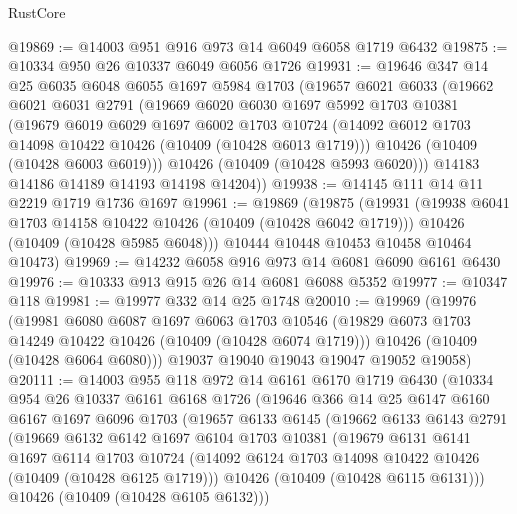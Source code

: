 \begin{lexlean}{RustCore}
\begin{coremodule}
@19869 := @14003 @951 @916 @973 @14 @6049 @6058 @1719 @6432
@19875 := @10334 @950 @26 @10337 @6049 @6056 @1726
@19931 := @19646
    @347
    @14
    @25
    @6035
    @6048
    @6055
    @1697
    @5984
    @1703
    (@19657
      @6021
      @6033
      (@19662
        @6021
        @6031
        @2791
        (@19669
          @6020
          @6030
          @1697
          @5992
          @1703
          @10381
          (@19679
            @6019
            @6029
            @1697
            @6002
            @1703
            @10724
            (@14092 @6012 @1703 @14098 @10422 @10426 (@10409 (@10428 @6013 @1719)))
            @10426
            (@10409 (@10428 @6003 @6019)))
          @10426
          (@10409 (@10428 @5993 @6020)))
        @14183
        @14186
        @14189
        @14193
        @14198
        @14204))
@19938 := @14145 @111 @14 @11 @2219 @1719 @1736 @1697
@19961 := @19869
    (@19875
      (@19931
        (@19938 @6041 @1703 @14158 @10422 @10426 (@10409 (@10428 @6042 @1719)))
        @10426
        (@10409 (@10428 @5985 @6048)))
      @10444
      @10448
      @10453
      @10458
      @10464
      @10473)
@19969 := @14232 @6058 @916 @973 @14 @6081 @6090 @6161 @6430
@19976 := @10333 @913 @915 @26 @14 @6081 @6088 @5352
@19977 := @10347 @118
@19981 := @19977 @332 @14 @25 @1748
@20010 := @19969
    (@19976
      (@19981
        @6080
        @6087
        @1697
        @6063
        @1703
        @10546
        (@19829 @6073 @1703 @14249 @10422 @10426 (@10409 (@10428 @6074 @1719)))
        @10426
        (@10409 (@10428 @6064 @6080)))
      @19037
      @19040
      @19043
      @19047
      @19052
      @19058)
@20111 := @14003
    @955
    @118
    @972
    @14
    @6161
    @6170
    @1719
    @6430
    (@10334
      @954
      @26
      @10337
      @6161
      @6168
      @1726
      (@19646
        @366
        @14
        @25
        @6147
        @6160
        @6167
        @1697
        @6096
        @1703
        (@19657
          @6133
          @6145
          (@19662
            @6133
            @6143
            @2791
            (@19669
              @6132
              @6142
              @1697
              @6104
              @1703
              @10381
              (@19679
                @6131
                @6141
                @1697
                @6114
                @1703
                @10724
                (@14092 @6124 @1703 @14098 @10422 @10426 (@10409 (@10428 @6125 @1719)))
                @10426
                (@10409 (@10428 @6115 @6131)))
              @10426
              (@10409 (@10428 @6105 @6132)))

\end{coremodule}
\end{lexlean}
